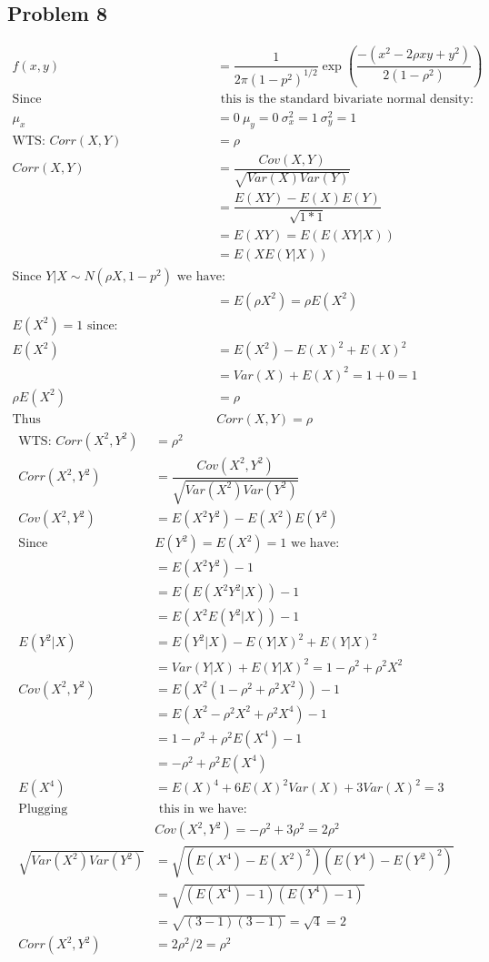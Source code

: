 \documentclass{article}
\begin{document}
\begin{flushleft}
\section*{Problem 8}
\begin{align*}
f(x,y)&=\dfrac{1}{2\pi(1-p^2)^{1/2}}\exp\left(\dfrac{-(x^2-2\rho xy+y^2)}{2(1-\rho^2)}\right)\\
\text{Since}&\text{ this is the standard bivariate normal density:}\\
\mu_x&=0 \ \mu_y=0 \ \sigma^2_x=1 \ \sigma^2_y=1\\
\text{WTS: } Corr(X,Y)&=\rho\\
Corr(X,Y)&=\dfrac{Cov(X,Y)}{\sqrt{Var(X)Var(Y)}}\\
&=\dfrac{E(XY)-E(X)E(Y)}{\sqrt{1*1}}\\
&=E(XY)=E(E(XY|X))\\
&=E(X E(Y|X))\\
\text{Since } Y|X \sim N(\rho X, 1-p^2) \text{ we have:}\\
&=E(\rho X^2)=\rho E(X^2)\\
E(X^2)=1 \text{ since:}\\
E(X^2)&=E(X^2)-E(X)^2+E(X)^2\\
&=Var(X)+E(X)^2=1+0=1\\
\rho E(X^2)&=\rho\\
\text{Thus }& Corr(X,Y)=\rho
\end{align*}
\begin{align*}
\text{WTS: } Corr(X^2,Y^2)&=\rho^2\\
Corr(X^2,Y^2)&=\dfrac{Cov(X^2,Y^2)}{\sqrt{Var(X^2)Var(Y^2)}}\\
Cov(X^2,Y^2)&=E(X^2Y^2)-E(X^2)E(Y^2)\\
\text{Since }& E(Y^2)=E(X^2)=1 \text{ we have:}\\
&=E(X^2Y^2)-1\\
&=E(E(X^2Y^2|X))-1\\
&=E(X^2E(Y^2|X))-1\\
E(Y^2|X)&=E(Y^2|X)-E(Y|X)^2+E(Y|X)^2\\
&=Var(Y|X)+E(Y|X)^2=1-\rho^2+\rho^2 X^2\\
Cov(X^2,Y^2)&=E(X^2(1-\rho^2+\rho^2 X^2))-1\\
&=E(X^2-\rho^2X^2+\rho^2X^4)-1\\
&=1-\rho^2+\rho^2E(X^4)-1\\
&=-\rho^2+\rho^2E(X^4)\\
E(X^4)&=E(X)^4+6E(X)^2Var(X)+3Var(X)^2=3\\
\text{Plugging}&\text{ this in we have:}\\
&Cov(X^2,Y^2)=-\rho^2+3\rho^2=2\rho^2\\
\sqrt{Var(X^2)Var(Y^2)}&=\sqrt{(E(X^4)-E(X^2)^2)(E(Y^4)-E(Y^2)^2)}\\
&=\sqrt{(E(X^4)-1)(E(Y^4)-1)}\\
&=\sqrt{(3-1)(3-1)}=\sqrt{4}=2\\
Corr(X^2,Y^2)&=2\rho^2/2=\rho^2
\end{align*}

\end{flushleft}
\end{document}
